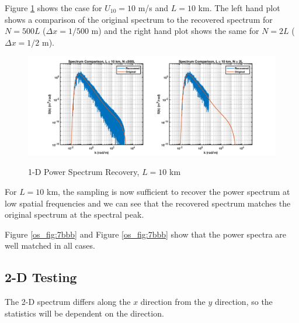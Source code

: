 Figure \ref{os_fig:7aaa} shows the case for $U_{10} = 10$ m/s and $L = 10$ km. The left hand plot shows a comparison of the original spectrum to the recovered spectrum for $N = 500L$ ($\Delta x = 1/500$ m) and the right hand plot shows the same for $N=2L$ ($\Delta x = 1/2$ m).
\begin{figure}[H]
  \begin{center}
\includegraphics[width=6in]{../media/Ocean_Surface/sea_surface_spectra_10000.png}
  \end{center}
  \renewcommand{\baselinestretch}{1} \small\normalsize
  \begin{quote}
    \caption[1-D Power Spectrum Recovery, $L = 10$ km]{1-D Power Spectrum Recovery, $L = 10$ km\label{os_fig:7aaa}}
  \end{quote}
\end{figure}
\renewcommand{\baselinestretch}{2} \small\normalsize
For $L = 10$ km, the sampling is now sufficient to recover the power spectrum at low spatial frequencies and we can see that the recovered spectrum matches the original spectrum at the spectral peak.

Figure \ref{os_fig:7bbb} and Figure \ref{os_fig:7bbb} show that the power spectra are well matched in all cases.

\subsection{2-D Testing}
The 2-D spectrum differs along the $x$ direction from the $y$ direction, so the statistics will be dependent on the direction.

